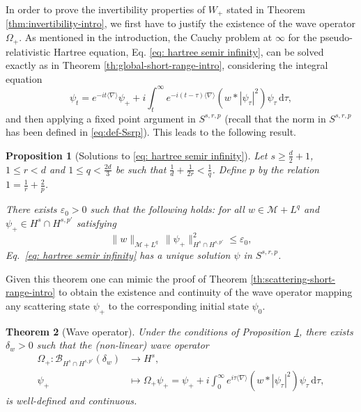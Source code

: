 \documentclass[12pt]{article}
\theoremstyle{plain}
\newtheorem{theo}{Theorem}[section]
\newtheorem{prop}[theo]{Proposition}
\newcommand{\meas}{\mathcal{M}}
\begin{document}
In order to prove the invertibility properties of $W_+$ stated in Theorem \ref{thm:invertibility-intro}, we first have to justify the existence of the wave operator $\Omega_+$. As mentioned in the introduction, the Cauchy problem at $\infty$ for the pseudo-relativistic Hartree equation,  Eq. \eqref{eq: hartree semir infinity}, can be solved exactly as in Theorem \ref{th:global-short-range-intro}, considering the integral equation  
	\begin{equation*}
		\psi_t = e^{-it\langle \nabla \rangle}\psi_+ +i \int_t^\infty e^{-i(t-\tau)\langle \nabla \rangle} (w * |\psi_\tau|^2)\psi_\tau\, \mathrm{d}\tau,
	\end{equation*}
and then applying a fixed point argument in $S^{s,r,p}$ (recall that the norm in $S^{s,r,p}$ has been defined in \eqref{eq:def-Ssrp}). This leads to the following result.

	\begin{prop}[Solutions to \eqref{eq: hartree semir infinity}]
		\label{th:global-short-range-infinity}
	Let $s\ge\frac{d}{2}+  1$, $1\le r <d$ and $1\le q<\frac{2d}{3}$ be such that $\frac{1}{d}+\frac{1}{2r}<\frac{1}{q}$. Define $p$ by the relation $1=\frac{1}{r}+\frac{2}{p}$.

There exists $\varepsilon_0>0$ such that the following holds: for all $w\in\meas+L^{q}$ and~$\psi_{+}\in H^{s}\cap H^{s,p'}$ satisfying
\begin{equation}\label{eq:cond_w_psi0}
\|w\|_{\meas+L^{q}}\,\|\psi_{+}\|_{H^{s}\cap H^{s,p'}}^{2}\le\varepsilon_0,
\end{equation}
 Eq.~\eqref{eq: hartree semir infinity} has a unique solution $\psi$ in $S^{s,r,p}$.
	\end{prop}


Given this theorem one can mimic the proof of Theorem \ref{th:scattering-short-range-intro} to obtain the existence and continuity of the wave operator mapping any scattering state $\psi_+$ to the corresponding initial state $\psi_0$.

	\begin{theo}[Wave operator]\label{cor:scat2}
Under the conditions of Proposition \ref{th:global-short-range-infinity},  there exists $\delta_w>0$ such that the (non-linear) wave operator 
		\begin{align*}
    \Omega_+:\mathcal{B}_{H^s\cap H^{s,p'}}(\delta_w)&\to H^s, \\ 
    \psi_+&\mapsto  \Omega_+\psi_+= \psi_+ + i \int_0^\infty e^{i\tau\langle\nabla\rangle} (w * |\psi_\tau|^2)\psi_\tau\, \mathrm{d}\tau,
\end{align*}
is well-defined and continuous.
	\end{theo}
\end{document}

